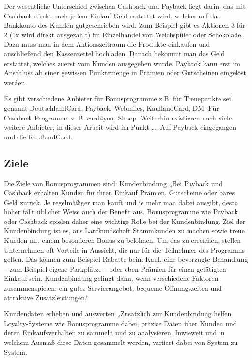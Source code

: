 Der wesentliche Unterschied zwischen Cashback und Payback liegt darin, das mit Cashback direkt nach jedem Einlauf Geld erstattet wird, welcher auf das Bankkonto des Kunden gutgeschrieben wird. Zum Beispiel gibt es Aktionen 3 für 2 (1x wird direkt ausgezahlt) im Einzelhandel von Weichspüler oder Schokolade. Dazu muss man in dem Aktionszeitraum die Produkte einkaufen und anschließend den Kassenzettel hochladen. Danach bekommt man das Geld erstattet, welches zuerst vom Kunden ausgegeben wurde. Payback kann erst im Anschluss ab einer gewissen Punktemenge in Prämien oder Gutscheinen eingelöst werden. \label{TreueCash} \newline

\noident Es gibt verschiedene Anbieter für Bonusprogramme z.B. für Treuepunkte sei genannt DeutschlandCard, Payback, Webmiles, KauflandCard, DM. Für Cashback-Programme z. B. card4you, Shoop. Weiterhin existieren noch viele weitere Anbieter, in dieser Arbeit wird im Punkt …. Auf Payback eingegangen und die KauflandCard.

\subsection {Ziele}
Die Ziele von Bonusprogrammen sind: \newline
Kundenbindung \newline
„Bei Payback und Cashback erhalten Kunden für ihren Einkauf Prämien, Gutscheine oder bares Geld zurück. Je regelmäßiger man kauft und je mehr man dabei ausgibt, desto höher fällt üblicher Weise auch der Benefit aus. Bonusprogramme wie Payback oder Cashback spielen daher eine wichtige Rolle bei der Kundenbindung.
Ziel der Kundenbindung ist es, aus Laufkundschaft Stammkunden zu machen sowie treue Kunden mit einem besonderen Bonus zu belohnen. Um das zu erreichen, stellen Unternehmen oft Vorteile in Aussicht, die nur für die Teilnehmer des Programms gelten. Das können zum Beispiel Rabatte beim Kauf, eine bevorzugte Behandlung – zum Beispiel eigene Parkplätze – oder eben Prämien für einen getätigten Einkauf sein.
Kundenbindung gelingt dann, wenn verschiedene Faktoren zusammenspielen: ein gutes Serviceangebot, bequeme Öffnungszeiten und attraktive Zusatzleistungen.“ \label{paycashback_all} \newline

Kundendaten erheben und auswerten \newline
„Zusätzlich zur Kundenbindung helfen Loyalty-Systeme wie Bonusprogramme dabei, präzise Daten über Kunden und deren Einkaufsverhalten zu sammeln und zu analysieren. Inwieweit und in welchem Ausmaß diese Daten gesammelt werden, variiert dabei von System zu System.


